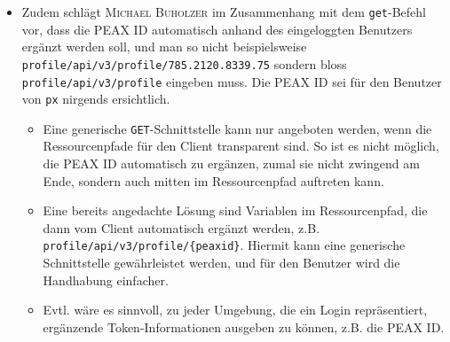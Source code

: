 \begin{itemize}
\begin{itemize}
        \item \textsc{Go} bietet jedoch mit \texttt{json.Indent} eine sehr komfortable Funktion, womit ein beliebiger JSON-Payload\footnote{D.h. nicht nur ein JSON-Payload, dessen Struktur mittels einer \texttt{struct} und den entsprechenden Annotations beschrieben ist, was zu einem unverhältnismässigen Mehraufwand führen würde, zumal dann jeder mögliche Payload statisch beschrieben sein müsste.} einfach formatiert werden kann.
        \item Der Vorschlag soll umgesetzt werden. Weitere Features im Zusammenhang mit generischer JSON-Verarbeitung sollen jedoch der \textsc{Unix}-Philosophie entsprechend an \texttt{jq} oder ähnliche Programme mittels Pipe delegiert werden.
    \end{itemize}
\item Zudem schlägt \textsc{Michael Buholzer} im Zusammenhang mit dem \texttt{get}-Befehl vor, dass die PEAX ID automatisch anhand des eingeloggten Benutzers ergänzt werden soll, und man so nicht beispielsweise \texttt{profile/api/v3/profile/785.2120.8339.75} sondern bloss \texttt{profile/api/v3/profile} eingeben muss. Die PEAX ID sei für den Benutzer von \texttt{px} nirgends ersichtlich.
    \begin{itemize}
        \item Eine generische \texttt{GET}-Schnittstelle kann nur angeboten werden, wenn die Ressourcenpfade für den Client transparent sind. So ist es nicht möglich, die PEAX ID automatisch zu ergänzen, zumal sie nicht zwingend am Ende, sondern auch mitten im Ressourcenpfad auftreten kann.
        \item Eine bereits angedachte Lösung sind Variablen im Ressourcenpfad, die dann vom Client automatisch ergänzt werden, z.B. \texttt{profile/api/v3/profile/\{peaxid\}}. Hiermit kann eine generische Schnittstelle gewährleistet werden, und für den Benutzer wird die Handhabung einfacher.
        \item Evtl. wäre es sinnvoll, zu jeder Umgebung, die ein Login repräsentiert, ergänzende Token-Informationen ausgeben zu können, z.B. die PEAX ID.
    \end{itemize}
\end{itemize}
